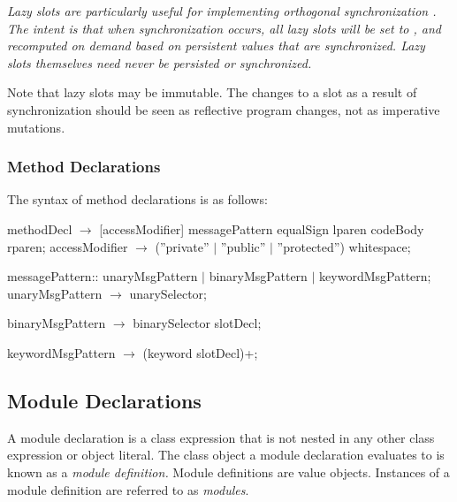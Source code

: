 \documentclass{article}
\begin{document}

{\it 
Lazy slots are particularly useful for implementing {\em orthogonal synchronization} \cite{bracha05}. The intent is that when synchronization occurs, all lazy slots will be set to \NIL{}, and recomputed on demand based on persistent values that are synchronized. Lazy slots themselves need never be persisted or synchronized.

Note that lazy slots may be immutable. The changes to a slot as a result of synchronization should be seen as reflective program changes, not as imperative mutations.
}

\subsubsection{Method Declarations}
\label{methodDecls}

The syntax of method declarations is as follows:

\begin{newspeak}
methodDecl $\rightarrow$ [accessModifier] messagePattern equalSign 
                  lparen codeBody rparen;
accessModifier $\rightarrow$  (''private'' $|$ 
                        ''public'' $|$
                        ''protected'') whitespace;
                    
messagePattern::  unaryMsgPattern $|$
                       binaryMsgPattern $|$
                       keywordMsgPattern;
unaryMsgPattern $\rightarrow$ unarySelector;

binaryMsgPattern $\rightarrow$ binarySelector slotDecl;
                                                         
keywordMsgPattern $\rightarrow$ (keyword slotDecl)+;
\end{newspeak}


\subsection{Module Declarations} 
\label{module}

A module declaration is a class expression that is not nested in any other class expression or object literal.  The class object a module declaration evaluates to is known as a {\em module definition.} Module definitions are value objects.  Instances of a module definition are referred to as {\em modules}.
\end{document}
